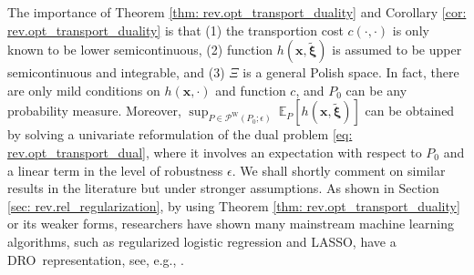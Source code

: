 \documentclass[final,onefignum,onetabnum]{class}
\newcommand{\ee}[2]{\mathbb{E}_{#1} \left[ #2 \right]}
\newcommand{\bs}[1]{\boldsymbol{#1}} %
\newcommand{\Ts}[1]{\mathbbmtt{#1}} %
\newcommand{\Cs}[1]{\mathcal{#1}} %
\newcommand{\txi}{\tilde{\bs{\xi}}}
\newcommand{\nomP}{\Ts{P}_{0}}
\newcommand{\dro}{DRO}
\begin{document}
The importance of Theorem \ref{thm: rev.opt_transport_duality} and Corollary  \ref{cor: rev.opt_transport_duality}   is that (1) the transportion cost $c(\cdot, \cdot)$ is only known to be lower semicontinuous, (2) function $h(\bs{x},\txi)$ is assumed to be upper semicontinuous and integrable, and (3)  $\Xi$ is a general Polish space. In fact, 
there are only mild conditions on $h(\bs{x}, \cdot)$ and function $c$, and $P_{0}$ can be any probability measure. %
Moreover, $\sup_{P \in \Cs{P}^{\text{W}}(P_{0};\epsilon)} \ \ee{P}{h(\bs{x},\txi)}$ can be obtained by solving   a univariate reformulation of the dual problem \eqref{eq: rev.opt_transport_dual}, where it involves an expectation with respect to $P_{0}$ and a linear term in the level of robustness $\epsilon$. We shall shortly comment on similar results in the literature but under stronger assumptions. 
As shown in Section \ref{sec: rev.rel_regularization}, by using Theorem  \ref{thm: rev.opt_transport_duality} or its weaker forms, researchers have shown many mainstream machine learning algorithms, such as regularized logistic regression and LASSO, have a \dro\ representation, see, e.g., \citet{blanchet2016robust,blanchet2017groupwise,blanchet2017Semi,gao2017,shafieezadeh2015,shafieezadeh2017}. %


\end{document}
